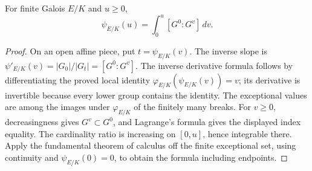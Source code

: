 \begin{lemma}
\label{fw:upper-inverse-integral}
\leanok
For finite Galois $E/K$ and $u\geq0$,
\[
 \psi_{E/K}(u)=\int_0^u[G^0:G^v]\,dv.
\]
\end{lemma}
\begin{proof}
On an open affine piece, put $t=\psi_{E/K}(v)$.
The inverse slope is
$\psi'_{E/K}(v)=|G_0|/|G_t|=[G^0:G^v]$.
The inverse derivative formula follows by differentiating the proved local
identity $\varphi_{E/K}(\psi_{E/K}(v))=v$; its derivative is invertible
because every lower group contains the identity. The exceptional values
are among the images under $\varphi_{E/K}$ of the finitely many breaks.
For $v\geq0$, decreasingness gives $G^v\subset G^0$, and Lagrange's
formula gives the displayed index equality. The cardinality ratio is
increasing on $[0,u]$, hence integrable there. Apply the fundamental
theorem of calculus off the finite exceptional set, using continuity and
$\psi_{E/K}(0)=0$, to obtain the formula including endpoints.
\end{proof}


